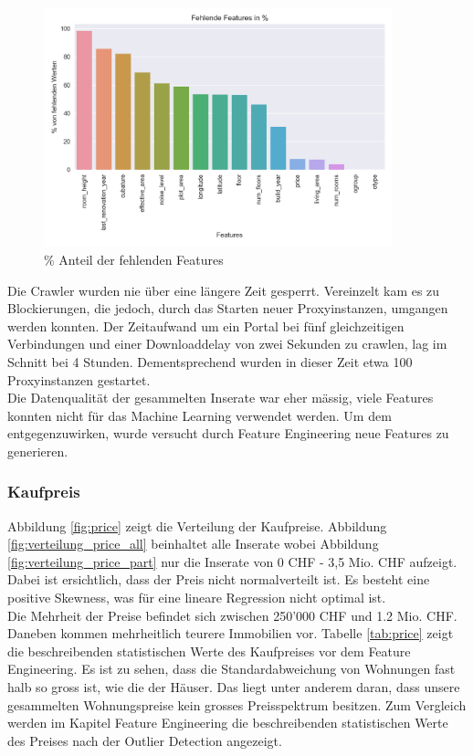 \begin{figure}[h!]
\centering
\includegraphics[width=0.9\textwidth]{images/missing_values.png}
\caption[\% Anteil der fehlenden Features]{\% Anteil der fehlenden Features}%
\label{fig:features}
\end{figure}

Die Crawler wurden nie über eine längere Zeit gesperrt. Vereinzelt kam es zu Blockierungen, die jedoch, durch das Starten neuer Proxyinstanzen, umgangen werden konnten. Der Zeitaufwand um ein Portal bei fünf gleichzeitigen Verbindungen und einer Downloaddelay von zwei Sekunden zu crawlen, lag im Schnitt bei 4 Stunden. Dementsprechend wurden in dieser Zeit etwa 100 Proxyinstanzen gestartet.\\[2ex]
%
Die Datenqualität der gesammelten Inserate war eher mässig, viele Features konnten nicht für das Machine Learning verwendet werden. Um dem entgegenzuwirken, wurde versucht durch Feature Engineering neue Features zu generieren.

\subsubsection{Kaufpreis}
Abbildung \ref{fig:price} zeigt die Verteilung der Kaufpreise. Abbildung \ref{fig:verteilung_price_all} beinhaltet alle Inserate wobei Abbildung \ref{fig:verteilung_price_part} nur die Inserate von 0 CHF - 3,5 Mio. CHF aufzeigt. Dabei ist ersichtlich, dass der Preis nicht normalverteilt ist. Es besteht eine positive Skewness, was für eine lineare Regression nicht optimal ist.\\
Die Mehrheit der Preise befindet sich zwischen 250'000 CHF und 1.2 Mio. CHF. Daneben kommen mehrheitlich teurere Immobilien vor. Tabelle \ref{tab:price} zeigt die beschreibenden statistischen Werte des Kaufpreises vor dem Feature Engineering. Es ist zu sehen, dass die Standardabweichung von Wohnungen fast halb so gross ist, wie die der Häuser. Das liegt unter anderem daran, dass unsere gesammelten Wohnungspreise kein grosses Preisspektrum besitzen. Zum Vergleich werden im Kapitel Feature Engineering die beschreibenden statistischen Werte des Preises nach der Outlier Detection angezeigt.

